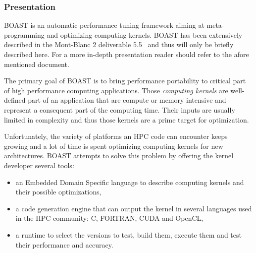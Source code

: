 \subsubsection{Presentation}

BOAST is an automatic performance tuning framework aiming at meta-programming and optimizing computing kernels.
BOAST has been extensively described in the Mont-Blanc 2 deliverable 5.5~\cite{tichadou15} and thus will only be briefly described here.
For a more in-depth presentation reader should refer to the afore mentioned document.

The primary goal of BOAST is to bring performance portability to critical part of high performance computing applications.
Those \emph{computing kernels} are well-defined part of an application that are compute or memory intensive and represent a consequent part of the computing time.
Their inputs are usually limited in complexity and thus those kernels are a prime target for optimization.

Unfortunately, the variety of platforms an HPC code can encounter keeps growing and a lot of time is spent optimizing computing kernels for new architectures.
BOAST attempts to solve this problem by offering the kernel developer several tools:
\begin{itemize}
  \item an Embedded Domain Specific language to describe computing kernels and their possible optimizations,
  \item a code generation engine that can output the kernel in several languages used in the HPC community: C, FORTRAN, CUDA and OpenCL,
  \item a runtime to select the versions to test, build them, execute them and test their performance and accuracy.
\end{itemize}

